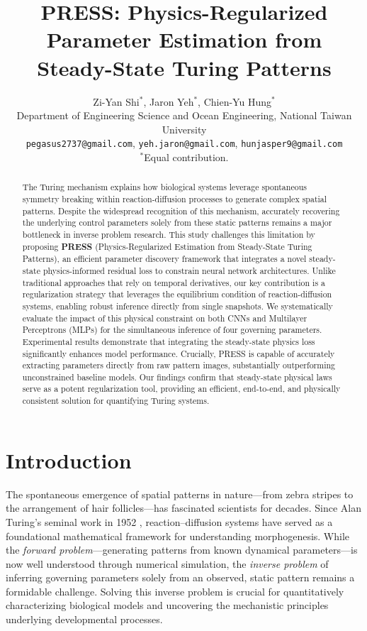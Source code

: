 \documentclass{article} %
\title{PRESS: Physics-Regularized Parameter Estimation from Steady-State Turing Patterns}
\author{
  Zi-Yan Shi$^*$, Jaron Yeh$^*$, Chien-Yu Hung$^*$\\
  Department of Engineering Science and Ocean Engineering, National Taiwan University\\
  \texttt{pegasus2737@gmail.com}, 
  \texttt{yeh.jaron@gmail.com}, 
  \texttt{hunjasper9@gmail.com}\\
  $^*$Equal contribution.
}
\begin{document}
\maketitle

\begin{abstract}
The Turing mechanism explains how biological systems leverage spontaneous symmetry breaking within reaction-diffusion processes to generate complex spatial patterns. Despite the widespread recognition of this mechanism, accurately recovering the underlying control parameters solely from these static patterns remains a major bottleneck in inverse problem research. This study challenges this limitation by proposing \textbf{PRESS} (Physics-Regularized Estimation from Steady-State Turing Patterns), an efficient parameter discovery framework that integrates a novel steady-state physics-informed residual loss to constrain neural network architectures. Unlike traditional approaches that rely on temporal derivatives, our key contribution is a regularization strategy that leverages the equilibrium condition of reaction-diffusion systems, enabling robust inference directly from single snapshots. We systematically evaluate the impact of this physical constraint on both CNNs and Multilayer Perceptrons (MLPs) for the simultaneous inference of four governing parameters. Experimental results demonstrate that integrating the steady-state physics loss significantly enhances model performance. Crucially, PRESS is capable of accurately extracting parameters directly from raw pattern images, substantially outperforming unconstrained baseline models. Our findings confirm that steady-state physical laws serve as a potent regularization tool, providing an efficient, end-to-end, and physically consistent solution for quantifying Turing systems.
\end{abstract}

\section{Introduction}

The spontaneous emergence of spatial patterns in nature---from zebra stripes to the arrangement of hair follicles---has fascinated scientists for decades. Since Alan Turing's seminal work in 1952 \cite{turing1952chemical}, reaction--diffusion systems have served as a foundational mathematical framework for understanding morphogenesis. While the \textit{forward problem}---generating patterns from known dynamical parameters---is now well understood through numerical simulation, the \textit{inverse problem} of inferring governing parameters solely from an observed, static pattern remains a formidable challenge. Solving this inverse problem is crucial for quantitatively characterizing biological models and uncovering the mechanistic principles underlying developmental processes.
\end{document}
